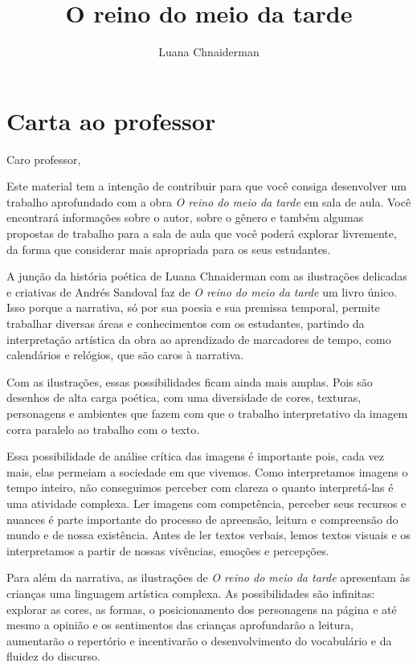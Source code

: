 \documentclass[11pt]{extarticle}
\newcommand{\AutorLivro}{Luana Chnaiderman}
\newcommand{\TituloLivro}{O reino do meio da tarde}
\newcommand{\colaborador}{Paulo Pompermaier}
\begin{document}
\title{\TituloLivro}
\author{\AutorLivro}
\def\authornotes{\colaborador}

\date{}
\maketitle

\tableofcontents

\section{Carta ao professor}

Caro professor,

Este material tem a intenção de contribuir para que você consiga desenvolver um trabalho aprofundado com a obra \textit{O reino do meio da tarde} em sala de aula.
Você encontrará informações sobre o autor, sobre o gênero e também 
algumas propostas de trabalho para a sala de aula que você poderá explorar livremente, 
da forma que considerar mais apropriada para os seus estudantes.

A junção da história poética de Luana Chnaiderman com as ilustrações delicadas e criativas de Andrés Sandoval faz de \textit{O reino do meio da tarde} um livro único. Isso porque a narrativa, só por sua poesia e sua premissa temporal, permite trabalhar diversas áreas e conhecimentos com os estudantes, partindo da interpretação artística da obra ao aprendizado de marcadores de tempo, como calendários e relógios, que são caros à narrativa.

Com as ilustrações, essas possibilidades ficam ainda mais amplas. Pois são desenhos de alta carga poética, com uma diversidade de cores, texturas, personagens e ambientes que fazem com que o trabalho interpretativo da imagem corra paralelo ao trabalho com o texto. 

Essa possibilidade de análise crítica das imagens é importante pois, cada vez mais, elas permeiam a sociedade em que vivemos. Como interpretamos 
imagens o tempo inteiro, não conseguimos perceber com clareza o quanto 
interpretá-las é uma atividade complexa. Ler imagens com competência, 
perceber seus recursos e nuances é parte importante do processo de apreensão, 
leitura e compreensão do mundo e de nossa existência. Antes de ler textos 
verbais, lemos textos visuais e os interpretamos a partir de nossas vivências, 
emoções e percepções.

Para além da narrativa, as ilustrações de \textit{O reino do meio da tarde} 
apresentam às crianças uma linguagem artística complexa.
As possibilidades são infinitas: explorar as cores, as formas, o posicionamento dos personagens na página e até mesmo a opinião e os sentimentos das crianças 
aprofundarão a leitura, aumentarão o repertório e incentivarão o desenvolvimento do vocabulário e da fluidez do discurso.
\end{document}
